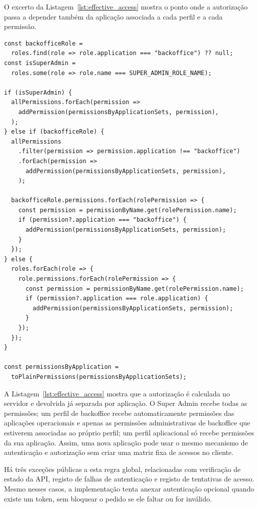 O excerto da Listagem~\ref{lst:effective_access} mostra o ponto onde a autorização passa a depender também da aplicação associada a cada perfil e a cada permissão.

\begin{lstlisting}[caption={Excerto do cálculo do acesso efetivo por aplicação}, label={lst:effective_access}]
const backofficeRole =
  roles.find(role => role.application === "backoffice") ?? null;
const isSuperAdmin =
  roles.some(role => role.name === SUPER_ADMIN_ROLE_NAME);

if (isSuperAdmin) {
  allPermissions.forEach(permission =>
    addPermission(permissionsByApplicationSets, permission),
  );
} else if (backofficeRole) {
  allPermissions
    .filter(permission => permission.application !== "backoffice")
    .forEach(permission =>
      addPermission(permissionsByApplicationSets, permission),
    );

  backofficeRole.permissions.forEach(rolePermission => {
    const permission = permissionByName.get(rolePermission.name);
    if (permission?.application === "backoffice") {
      addPermission(permissionsByApplicationSets, permission);
    }
  });
} else {
  roles.forEach(role => {
    role.permissions.forEach(rolePermission => {
      const permission = permissionByName.get(rolePermission.name);
      if (permission?.application === role.application) {
        addPermission(permissionsByApplicationSets, permission);
      }
    });
  });
}

const permissionsByApplication =
  toPlainPermissions(permissionsByApplicationSets);
\end{lstlisting}

A Listagem~\ref{lst:effective_access} mostra que a autorização é calculada no servidor e devolvida já separada por aplicação. O Super Admin recebe todas as permissões; um perfil de backoffice recebe automaticamente permissões das aplicações operacionais e apenas as permissões administrativas de backoffice que estiverem associadas ao próprio perfil; um perfil aplicacional só recebe permissões da sua aplicação. Assim, uma nova aplicação pode usar o mesmo mecanismo de autenticação e autorização sem criar uma matriz fixa de acessos no cliente.

Há três exceções públicas a esta regra global, relacionadas com verificação de estado da \gls{API}, registo de falhas de autenticação e registo de tentativas de acesso. Mesmo nesses casos, a implementação tenta anexar autenticação opcional quando existe um token, sem bloquear o pedido se ele faltar ou for inválido.

